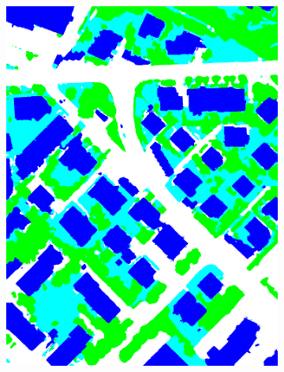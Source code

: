 \begin{figure}[htb]
\begin{subfigure}{0.24\textwidth}
   \includegraphics[width=1\linewidth]{fig/vai/30_auto.png}
 \end{subfigure}
 

\end{figure}
